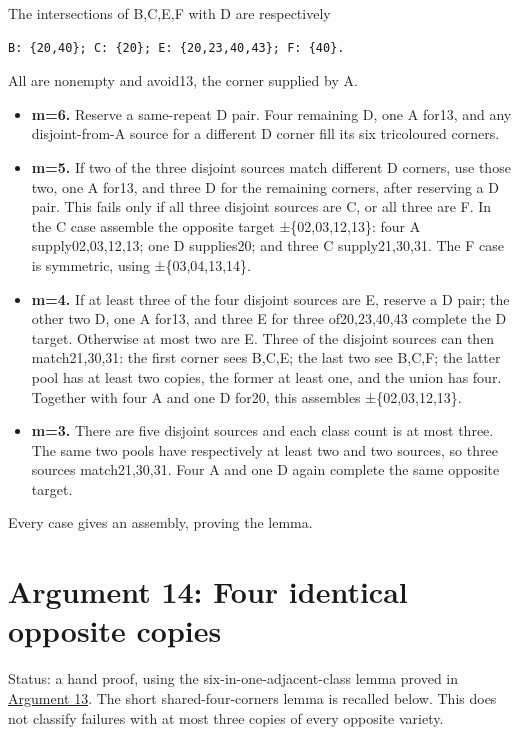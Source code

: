 \documentclass[
  10pt,
]{article}
\providecommand{\tightlist}{%
  \setlength{\itemsep}{0pt}\setlength{\parskip}{0pt}}
\begin{document}
The intersections of B,C,E,F with D are respectively

\begin{verbatim}
B: {20,40}; C: {20}; E: {20,23,40,43}; F: {40}.
\end{verbatim}

All are nonempty and avoid13, the corner supplied by A.

\begin{itemize}
\tightlist
\item
  \textbf{m=6.} Reserve a same-repeat D pair. Four remaining D, one A
  for13, and any disjoint-from-A source for a different D corner fill
  its six tricoloured corners.
\item
  \textbf{m=5.} If two of the three disjoint sources match different D
  corners, use those two, one A for13, and three D for the remaining
  corners, after reserving a D pair. This fails only if all three
  disjoint sources are C, or all three are F. In the C case assemble the
  opposite target ±\{02,03,12,13\}: four A supply02,03,12,13; one D
  supplies20; and three C supply21,30,31. The F case is symmetric, using
  ±\{03,04,13,14\}.
\item
  \textbf{m=4.} If at least three of the four disjoint sources are E,
  reserve a D pair; the other two D, one A for13, and three E for three
  of20,23,40,43 complete the D target. Otherwise at most two are E.
  Three of the disjoint sources can then match21,30,31: the first corner
  sees B,C,E; the last two see B,C,F; the latter pool has at least two
  copies, the former at least one, and the union has four. Together with
  four A and one D for20, this assembles ±\{02,03,12,13\}.
\item
  \textbf{m=3.} There are five disjoint sources and each class count is
  at most three. The same two pools have respectively at least two and
  two sources, so three sources match21,30,31. Four A and one D again
  complete the same opposite target.
\end{itemize}

Every case gives an assembly, proving the lemma.

\hypertarget{arg-14}{%
\section{Argument 14: Four identical opposite copies}\label{arg-14}}

Status: a hand proof, using the six-in-one-adjacent-class lemma proved
in \protect\hyperlink{arg-13}{Argument 13}. The short
shared-four-corners lemma is recalled below. This does not classify
failures with at most three copies of every opposite variety.
\end{document}
